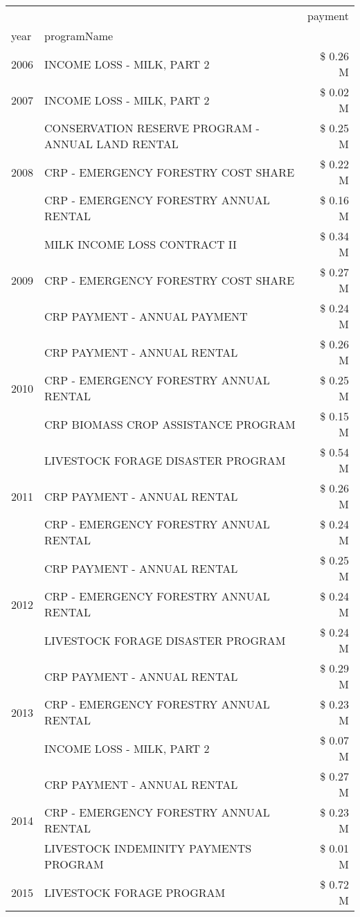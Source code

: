\begin{tabular}{llr}
\toprule
 &  & payment \\
year & programName &  \\
\midrule
2006 & INCOME LOSS - MILK, PART 2 & \$ 0.26 M \\
\cline{1-3}
2007 & INCOME LOSS - MILK, PART 2 & \$ 0.02 M \\
\cline{1-3}
\multirow[t]{3}{*}{2008} & CONSERVATION RESERVE PROGRAM - ANNUAL LAND RENTAL & \$ 0.25 M \\
 & CRP - EMERGENCY FORESTRY COST SHARE & \$ 0.22 M \\
 & CRP - EMERGENCY FORESTRY ANNUAL RENTAL & \$ 0.16 M \\
\cline{1-3}
\multirow[t]{3}{*}{2009} & MILK INCOME LOSS CONTRACT II & \$ 0.34 M \\
 & CRP - EMERGENCY FORESTRY COST SHARE & \$ 0.27 M \\
 & CRP PAYMENT - ANNUAL PAYMENT & \$ 0.24 M \\
\cline{1-3}
\multirow[t]{3}{*}{2010} & CRP PAYMENT - ANNUAL RENTAL & \$ 0.26 M \\
 & CRP - EMERGENCY FORESTRY ANNUAL RENTAL & \$ 0.25 M \\
 & CRP BIOMASS CROP ASSISTANCE PROGRAM & \$ 0.15 M \\
\cline{1-3}
\multirow[t]{3}{*}{2011} & LIVESTOCK FORAGE DISASTER PROGRAM & \$ 0.54 M \\
 & CRP PAYMENT - ANNUAL RENTAL & \$ 0.26 M \\
 & CRP - EMERGENCY FORESTRY ANNUAL RENTAL & \$ 0.24 M \\
\cline{1-3}
\multirow[t]{3}{*}{2012} & CRP PAYMENT - ANNUAL RENTAL & \$ 0.25 M \\
 & CRP - EMERGENCY FORESTRY ANNUAL RENTAL & \$ 0.24 M \\
 & LIVESTOCK FORAGE DISASTER PROGRAM & \$ 0.24 M \\
\cline{1-3}
\multirow[t]{3}{*}{2013} & CRP PAYMENT - ANNUAL RENTAL & \$ 0.29 M \\
 & CRP - EMERGENCY FORESTRY ANNUAL RENTAL & \$ 0.23 M \\
 & INCOME LOSS - MILK, PART 2 & \$ 0.07 M \\
\cline{1-3}
\multirow[t]{3}{*}{2014} & CRP PAYMENT - ANNUAL RENTAL & \$ 0.27 M \\
 & CRP - EMERGENCY FORESTRY ANNUAL RENTAL & \$ 0.23 M \\
 & LIVESTOCK INDEMINITY PAYMENTS PROGRAM & \$ 0.01 M \\
\cline{1-3}
\multirow[t]{3}{*}{2015} & LIVESTOCK FORAGE PROGRAM & \$ 0.72 M \\

\end{tabular}
